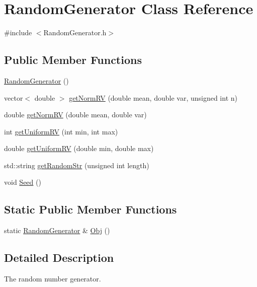 \hypertarget{classRandomGenerator}{}\section{Random\+Generator Class Reference}
\label{classRandomGenerator}


{\ttfamily \#include $<$Random\+Generator.\+h$>$}

\subsection*{Public Member Functions}
\begin{DoxyCompactItemize}
\item 
\hyperlink{classRandomGenerator_ad2b3256e634878160c7d8b6e865341b2}{Random\+Generator} ()
\item 
vector$<$ double $>$ \hyperlink{classRandomGenerator_ade01887d86acde9c158dd3ee80250e47}{get\+Norm\+R\+V} (double mean, double var, unsigned int n)
\item 
double \hyperlink{classRandomGenerator_a96a04ffa03a3f0a3e95d50d7c7e828cb}{get\+Norm\+R\+V} (double mean, double var)
\item 
int \hyperlink{classRandomGenerator_a39a6365864741e8246546162b6e5a34e}{get\+Uniform\+R\+V} (int min, int max)
\item 
double \hyperlink{classRandomGenerator_ad584ae9751a4cd03b981ced9c12f4e6e}{get\+Uniform\+R\+V} (double min, double max)
\item 
std\+::string \hyperlink{classRandomGenerator_a2da3e84fb399d8af423547376a1aae42}{get\+Random\+Str} (unsigned int length)
\item 
void \hyperlink{classRandomGenerator_a35e84fa76d2bfaba05671aa0f79c1b0a}{Seed} ()
\end{DoxyCompactItemize}
\subsection*{Static Public Member Functions}
\begin{DoxyCompactItemize}
\item 
static \hyperlink{classRandomGenerator}{Random\+Generator} \& \hyperlink{classRandomGenerator_a6c161d5ba97abe160d46d031f2211eb7}{Obj} ()
\end{DoxyCompactItemize}


\subsection{Detailed Description}
The random number generator. 

